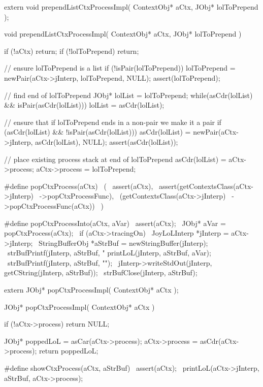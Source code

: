 \startCHeader
extern void prependListCtxProcessImpl(
  ContextObj* aCtx,
  JObj* lolToPrepend
);
\stopCHeader
{}

\startCCode
void prependListCtxProcessImpl(
  ContextObj* aCtx,
  JObj* lolToPrepend
) {
  if (!aCtx) return;
  if (!lolToPrepend) return;

  // ensure lolToPrepend is a list
  if (!isPair(lolToPrepend)) {
    lolToPrepend = newPair(aCtx->jInterp, lolToPrepend, NULL);
    assert(lolToPrepend);
  }

  // find end of lolToPrepend
  JObj* lolList = lolToPrepend;
  while(asCdr(lolList) && isPair(asCdr(lolList))) {
    lolList = asCdr(lolList);
  }

  // ensure that if lolToPrepend ends in a non-pair we make it a pair
  if (asCdr(lolList) && !isPair(asCdr(lolList))) {
    asCdr(lolList) = newPair(aCtx->jInterp, asCdr(lolList), NULL);
    assert(asCdr(lolList));
  }

  // place existing process stack at end of lolToPrepend
  asCdr(lolList)  = aCtx->process;
  aCtx->process   = lolToPrepend;
}
\stopCCode

\startCHeader
#define popCtxProcess(aCtx)                    \
  (                                            \
    assert(aCtx),                              \
    assert(getContextsClass(aCtx->jInterp)     \
      ->popCtxProcessFunc),                    \
    (getContextsClass(aCtx->jInterp)           \
      ->popCtxProcessFunc(aCtx))               \
  )

#define popCtxProcessInto(aCtx, aVar)                           \
assert(aCtx);                                                   \
JObj* aVar = popCtxProcess(aCtx);                               \
if (aCtx->tracingOn) {                                          \
  JoyLoLInterp *jInterp = aCtx->jInterp;                        \
  StringBufferObj *aStrBuf = newStringBuffer(jInterp);          \
  strBufPrintf(jInterp, aStrBuf, "%
  printLoL(jInterp, aStrBuf, aVar);                             \
  strBufPrintf(jInterp, aStrBuf, "\n");                         \
  jInterp->writeStdOut(jInterp, getCString(jInterp, aStrBuf));  \
  strBufClose(jInterp, aStrBuf);                                \
}
\stopCHeader

\setCHeaderStream{private}
\startCHeader
extern JObj* popCtxProcessImpl(
  ContextObj* aCtx
);
\stopCHeader
\setCHeaderStream{public}

\startCCode
JObj* popCtxProcessImpl(
  ContextObj* aCtx
) {
  if (!aCtx->process) return NULL;

  JObj* poppedLoL = asCar(aCtx->process);
  aCtx->process   = asCdr(aCtx->process);
  return poppedLoL;
}
\stopCCode

\startCHeader
#define showCtxProcess(aCtx, aStrBuf)              \
  assert(aCtx);                                    \
  printLoL(aCtx->jInterp, aStrBuf, aCtx->process); \
\stopCHeader

